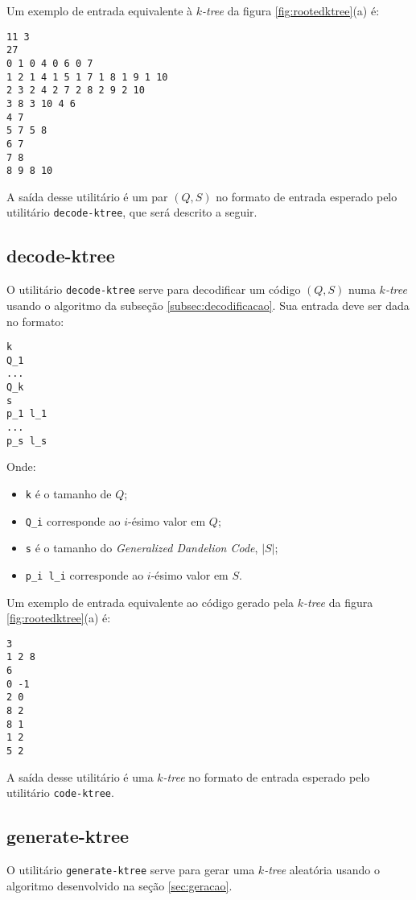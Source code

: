 Um exemplo de entrada equivalente à \emph{$k$-tree} da figura \ref{fig:rootedktree}(a) é:

\begin{lstlisting}
11 3
27
0 1 0 4 0 6 0 7
1 2 1 4 1 5 1 7 1 8 1 9 1 10
2 3 2 4 2 7 2 8 2 9 2 10
3 8 3 10 4 6
4 7
5 7 5 8
6 7
7 8
8 9 8 10
\end{lstlisting}

A saída desse utilitário é um par $(Q, S)$ no formato de entrada esperado pelo utilitário {\tt decode-ktree}, que será descrito a seguir.

\subsection{decode-ktree}

O utilitário {\tt decode-ktree} serve para decodificar um código $(Q, S)$ numa \emph{$k$-tree} usando o algoritmo da subseção \ref{subsec:decodificacao}. Sua entrada deve ser dada no formato:

\begin{lstlisting}
k
Q_1
...
Q_k
s
p_1 l_1
...
p_s l_s
\end{lstlisting}

Onde:

\begin{itemize}
  \item {\tt k} é o tamanho de $Q$;
  \item {\tt Q\_i} corresponde ao $i$-ésimo valor em $Q$;
  \item {\tt s} é o tamanho do \emph{Generalized Dandelion Code}, $|S|$;
  \item {\tt p\_i l\_i} corresponde ao $i$-ésimo valor em $S$.
\end{itemize}

Um exemplo de entrada equivalente ao código gerado pela \emph{$k$-tree} da figura \ref{fig:rootedktree}(a) é:

\begin{lstlisting}
3
1 2 8
6
0 -1
2 0
8 2
8 1
1 2
5 2
\end{lstlisting}

A saída desse utilitário é uma \emph{$k$-tree} no formato de entrada esperado pelo utilitário {\tt code-ktree}.

\subsection{generate-ktree}

O utilitário {\tt generate-ktree} serve para gerar uma \emph{$k$-tree} aleatória usando o algoritmo desenvolvido na seção \ref{sec:geracao}.

